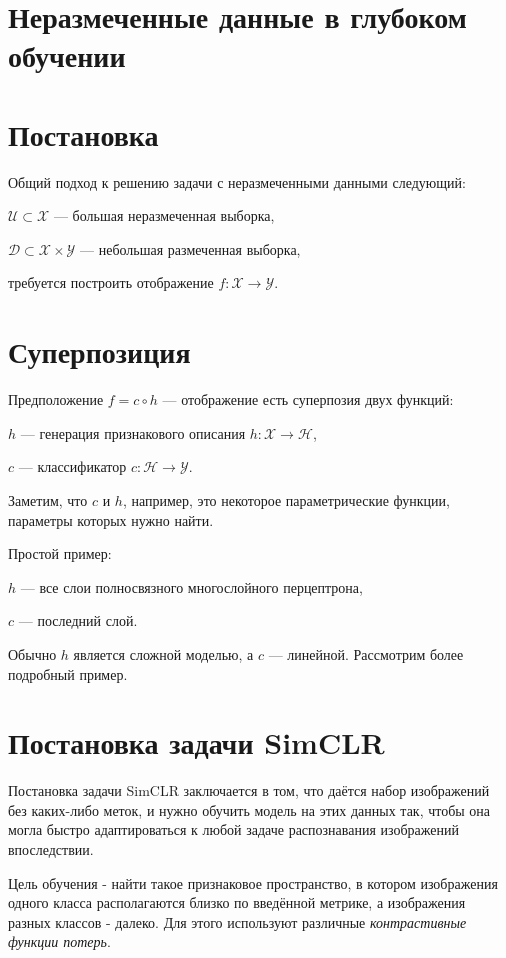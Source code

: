 \documentclass{article}
\begin{document}
\section*{Неразмеченные данные в глубоком обучении}

\section{Постановка}
\hspace{2em}Общий подход к решению задачи с неразмеченными данными следующий:

$\mathcal{U} \subset \mathcal{X}$ --- большая неразмеченная выборка,

$\mathcal{D} \subset  \mathcal{X}\times \mathcal{Y}$ --- небольшая размеченная выборка,

требуется построить отображение $f: \mathcal{X} \to \mathcal{Y}$.

\section{Суперпозиция}
\hspace{2em}Предположение $f = c  \circ  h$ --- отображение есть суперпозия двух функций:

$h$ --- генерация признакового описания $h: \mathcal{X} \to \mathcal{H}$,

$c$ --- классификатор $c: \mathcal{H} \to \mathcal{Y}$.

Заметим, что $c$ и $h$, например, это некоторое параметрические функции, параметры которых нужно найти.

Простой пример:

$h$ --- все слои полносвязного многослойного перцептрона,

$c$ --- последний слой.

Обычно $h$ является сложной моделью, а $c$ --- линейной. Рассмотрим более подробный пример.

\section{Постановка задачи SimCLR}

\hspace{2em}Постановка задачи SimCLR заключается в том, что даётся набор изображений без каких-либо меток, и нужно обучить модель на этих данных так, чтобы она могла быстро адаптироваться к любой задаче распознавания изображений впоследствии.

Цель обучения - найти такое признаковое пространство, в котором изображения одного класса располагаются близко по введённой метрике, а изображения разных классов - далеко. Для этого используют различные \textit{контрастивные функции потерь}.
\end{document}
